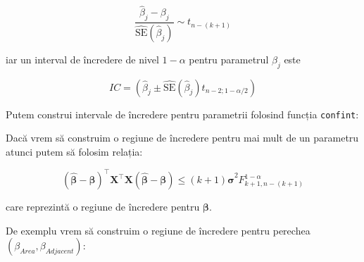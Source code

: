 \documentclass[]{article}
\newenvironment{Shaded}{\begin{snugshade}}{\end{snugshade}}
\newcommand{\KeywordTok}[1]{\textcolor[rgb]{0.13,0.29,0.53}{\textbf{#1}}}
\newcommand{\FloatTok}[1]{\textcolor[rgb]{0.00,0.00,0.81}{#1}}
\newcommand{\OperatorTok}[1]{\textcolor[rgb]{0.81,0.36,0.00}{\textbf{#1}}}
\newcommand{\NormalTok}[1]{#1}
\begin{document}
\[
\frac{\hat\beta_j-\beta_j}{\hat{\mathrm{SE}}(\hat\beta_j)}\sim t_{n-(k+1)}
\]

iar un interval de încredere de nivel \(1-\alpha\) pentru parametrul
\(\beta_j\) este

\[
IC = \left(\hat\beta_j\pm\hat{\mathrm{SE}}(\hat\beta_j)t_{n-2;1-\alpha/2}\right)
\]

Putem construi intervale de încredere pentru parametrii folosind funcția
\texttt{confint}:

\begin{Shaded}
\end{Shaded}

Dacă vrem să construim o regiune de încredere pentru mai mult de un
parametru atunci putem să folosim relația:

\[
(\hat{\boldsymbol \beta} - \boldsymbol \beta)^\intercal\boldsymbol X^\intercal \boldsymbol X (\hat{\boldsymbol \beta} - \boldsymbol \beta)\leq (k+1)\hat{\boldsymbol \sigma}^2F_{k+1, n-(k+1)}^{1-\alpha}
\]

care reprezintă o regiune de încredere pentru \(\boldsymbol \beta\).

De exemplu vrem să construim o regiune de încredere pentru perechea
\((\beta_{Area},\beta_{Adjacent})\):
\end{document}
